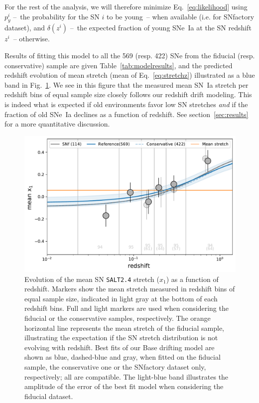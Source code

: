 \documentclass[]{aa} %
\begin{document}
For the rest of the analysis, we will therefore minimize Eq.~\ref{eq:likelihood}
using $p_y^i$ --~the probability for the SN $i$ to be young~-- when available
(i.e. for SNfactory dataset), and $\delta(z^i)$ --~the expected fraction of
young SNe~Ia at the SN redshift $z^i$~-- otherwise.

Results of fitting this model to all the 569 (resp. 422) SNe from the fiducial
(resp. conservative) sample are given Table~\ref{tab:modelresults}, and the
predicted redshift evolution of mean stretch (mean of Eq.~\ref{eq:stretchz})
illustrated as a blue band in Fig.~\ref{fig:modelall}. 
We see in this figure that the measured mean SN~Ia stretch per redshift bins of equal sample size closely follows our redshift drift modeling.
This is indeed what is expected if old environments favor low SN stretches
\citep[e.g.][]{howell2007} \emph{and} if the fraction of old SNe~Ia declines as
a function of redshift. See section~\ref{sec:results} for a more quantitative
discussion.

\begin{figure}
    \centering
    \includegraphics[width=0.7\linewidth]{Article_figures/stretchevol_all_vs_snf.pdf}
    \caption{Evolution of the mean SN \textsc{\texttt{SALT2.4}} stretch ($x_1$)
        as a function of redshift. Markers show the mean stretch measured in
        redshift bins of equal sample size, indicated in light gray at the
        bottom of each redshift bins. Full and light markers are used when
        considering the fiducial or the conservative samples, respectively. The
        orange horizontal line represents the mean stretch of the fiducial
        sample, illustrating the expectation if the SN stretch distribution is
        not evolving with redshift. Best fits of our Base drifting model are
        shown as blue, dashed-blue and gray, when fitted on the fiducial sample,
        the conservative one or the SNfactory dataset only, respectively; all
        are compatible. The light-blue band illustrates the amplitude of the
    error of the best fit model when considering the fiducial dataset.}
    \label{fig:modelall}
\end{figure}
\end{document}
